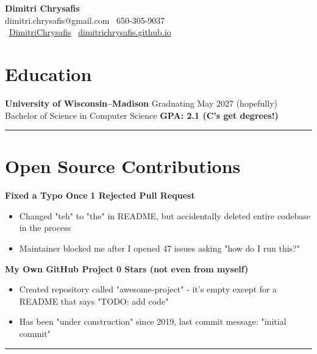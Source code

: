 \documentclass[11pt]{article}
\begin{document}
\begin{center}
\textbf{\Large Dimitri Chrysafis}\\[2pt]
dimitri.chrysafis@gmail.com \textbullet \ 650-305-9037\\
\faGithub \ \href{https://github.com/DimitriChrysafis}{DimitriChrysafis} \textbullet \ \href{https://dimitrichrysafis.github.io/}{dimitrichrysafis.github.io}
\end{center}

\vspace{4pt}

\section*{\textcolor{modernblue}{\Large Education}}
\textbf{University of Wisconsin–Madison} \hfill Graduating May 2027 (hopefully)\\
Bachelor of Science in Computer Science \hfill \textcolor{accentgreen}{\textbf{GPA: 2.1 (C's get degrees!)}}

\noindent\rule{\textwidth}{0.5pt}

\section*{\textcolor{modernblue}{\Large Open Source Contributions}}
\textbf{Fixed a Typo Once} \hfill \textcolor{modernblue}{\textbf{1 Rejected Pull Request}}
\begin{itemize}[leftmargin=*, topsep=0pt, itemsep=0pt, parsep=0pt]
\item Changed "teh" to "the" in README, but accidentally deleted entire codebase in the process
\item Maintainer blocked me after I opened 47 issues asking "how do I run this?"
\end{itemize}
\vspace{1pt}
\noindent\textbf{My Own GitHub Project} \hfill \textcolor{modernblue}{\textbf{0 Stars (not even from myself)}}
\begin{itemize}[leftmargin=*, topsep=0pt, itemsep=0pt, parsep=0pt]
\item Created repository called "awesome-project" - it's empty except for a README that says "TODO: add code"
\item Has been "under construction" since 2019, last commit message: "initial commit"
\end{itemize}

\noindent\rule{\textwidth}{0.5pt}
\end{document}
